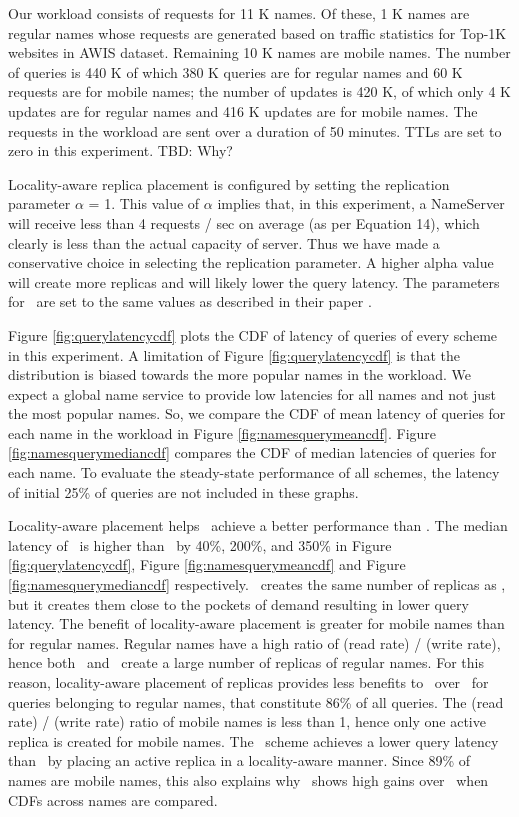Our workload consists of requests for 11 K names. Of these, 1 K names are regular names whose requests are generated based on traffic statistics for Top-1K websites in AWIS dataset. Remaining 10 K names are mobile names. The number of queries is 440 K of which 380 K queries are for regular names and 60 K requests are for mobile names; the number of updates  is 420 K, of which only 4 K updates are for regular names and 416 K updates are for mobile names.  The requests in the workload are sent over a duration of 50 minutes. TTLs are set to zero in this experiment. TBD: Why?


Locality-aware replica placement is configured by setting the replication parameter $\alpha$ = 1. This value of $\alpha$ implies that, in this experiment,  a NameServer will receive less than 4 requests / sec  on average (as per Equation 14), which clearly is less than the actual capacity of server. Thus we have made a conservative choice in selecting the replication parameter.  A higher alpha value will create more replicas and will likely lower the query latency. The parameters for \codons\ are set to the same values as described in their paper \cite{codons}.


Figure \ref{fig:querylatencycdf} plots the CDF of latency of queries of every scheme in this experiment. A limitation of Figure \ref{fig:querylatencycdf} is that the distribution is biased towards the more popular names in the workload. We expect a global name service to provide low latencies for all names and not just the most popular names. So, we compare the CDF of mean  latency of queries for each name in the workload in Figure \ref{fig:namesquerymeancdf}. Figure \ref{fig:namesquerymediancdf} compares the CDF of median latencies of queries for each name.  To evaluate the steady-state performance of all schemes, the latency of initial 25\% of queries are not included in these graphs.


Locality-aware placement helps \locaware\ achieve a better performance than \uniform.
The median latency of  \uniform\ is higher than \locaware\ by 40\%, 200\%, and 350\% in Figure \ref{fig:querylatencycdf},  Figure \ref{fig:namesquerymeancdf} and Figure \ref{fig:namesquerymediancdf}  respectively. 
\locaware\ creates the same number of replicas as \uniform, but it creates them close to the pockets of demand resulting in lower query latency. 
The benefit of locality-aware placement is greater for mobile names than for regular names.
Regular names have a high ratio of (read rate) / (write rate), hence both \uniform\ and \locaware\ create a large number of replicas of regular names. 
For this reason, locality-aware placement of replicas provides less benefits to \locaware\ over \uniform\ for queries belonging to regular names, that constitute 86\% of all queries. 
The (read rate) / (write rate) ratio of mobile names is less than 1, hence only one active replica is created for mobile names. The \locaware\ scheme achieves a lower query latency than \uniform\ by placing an active replica in a locality-aware manner. Since 89\% of names are mobile names, this also explains why \locaware\ shows high gains over \uniform\ when CDFs across names are compared.

